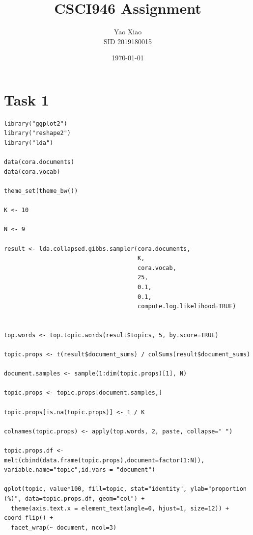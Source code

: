\documentclass{article}
\title{CSCI946 Assignment}
\author{Yao Xiao \\ SID 2019180015}
\date{\today}
\begin{document}
\maketitle

\section{Task 1}
\begin{lstlisting}
library("ggplot2")
library("reshape2")
library("lda")

data(cora.documents)
data(cora.vocab)

theme_set(theme_bw())

K <- 10

N <- 9

result <- lda.collapsed.gibbs.sampler(cora.documents,
                                      K,
                                      cora.vocab,
                                      25,
                                      0.1,
                                      0.1,
                                      compute.log.likelihood=TRUE)


top.words <- top.topic.words(result$topics, 5, by.score=TRUE)

topic.props <- t(result$document_sums) / colSums(result$document_sums)

document.samples <- sample(1:dim(topic.props)[1], N)

topic.props <- topic.props[document.samples,]

topic.props[is.na(topic.props)] <- 1 / K

colnames(topic.props) <- apply(top.words, 2, paste, collapse=" ")

topic.props.df <- melt(cbind(data.frame(topic.props),document=factor(1:N)), variable.name="topic",id.vars = "document")

qplot(topic, value*100, fill=topic, stat="identity", ylab="proportion (%)", data=topic.props.df, geom="col") +
  theme(axis.text.x = element_text(angle=0, hjust=1, size=12)) + coord_flip() +
  facet_wrap(~ document, ncol=3)
\end{lstlisting}
\end{document}
